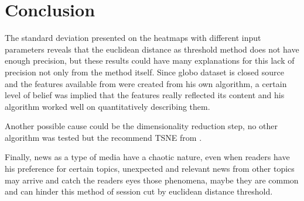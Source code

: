\documentclass[ecp,tc,english]{iiufrgs}
\begin{document}

\chapter{Conclusion}
The standard deviation presented on the heatmaps with different input parameters reveals that the euclidean distance as threshold method does not have enough precision, but these results could have many explanations for this lack of precision not only from the method itself. Since globo dataset is closed source and the features available from \cite{deSouzaPereiraMoreira:2018:CDL:3240323.3240331} were created from his own algorithm, a certain level of belief was implied that the features really reflected its content and his algorithm worked well on quantitatively describing them.

Another possible cause could be the dimensionality reduction step, no other algorithm was tested but the recommend TSNE from \cite{deSouzaPereiraMoreira:2018:CDL:3240323.3240331}.

Finally, news as a type of media have a chaotic nature, even when readers have his preference for certain topics, unexpected and relevant news from other topics may arrive and catch the readers eyes those phenomena, maybe they are common and can hinder this method of session cut by euclidean distance threshold. 



\end{document}
